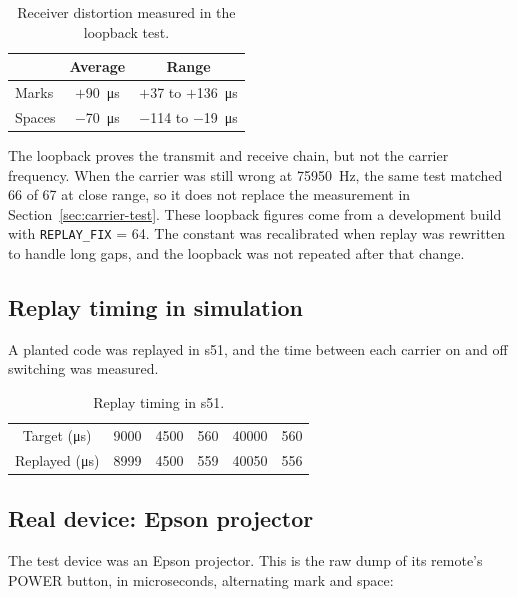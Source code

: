 \documentclass[11pt,a4paper]{article}
\newcommand{\code}[1]{\texttt{#1}}
\begin{document}
\begin{table}[H]
\centering
\caption{Receiver distortion measured in the loopback test.}
\label{tab:distortion}
\begin{tabular}{lcc}
\toprule
 & Average & Range\\
\midrule
Marks & $+$\qty{90}{\micro\second} & $+$37 to $+$\qty{136}{\micro\second}\\
Spaces & $-$\qty{70}{\micro\second} & $-$114 to $-$\qty{19}{\micro\second}\\
\bottomrule
\end{tabular}
\end{table}

The loopback proves the transmit and receive chain, but not the carrier frequency. When the carrier was still wrong at \qty{75950}{\hertz}, the same test matched 66 of 67 at close range, so it does not replace the measurement in Section~\ref{sec:carrier-test}. These loopback figures come from a development build with \code{REPLAY\_FIX} = 64. The constant was recalibrated when replay was rewritten to handle long gaps, and the loopback was not repeated after that change.

\subsection{Replay timing in simulation}

A planted code was replayed in s51, and the time between each carrier on and off switching was measured.

\begin{table}[H]
\centering
\caption{Replay timing in s51.}
\label{tab:replay}
\begin{tabular}{cccccc}
\toprule
Target (\unit{\micro\second}) & \num{9000} & \num{4500} & 560 & \num{40000} & 560\\
Replayed (\unit{\micro\second}) & \num{8999} & \num{4500} & 559 & \num{40050} & 556\\
\bottomrule
\end{tabular}
\end{table}

\subsection{Real device: Epson projector}
\label{sec:epson}

The test device was an Epson projector. This is the raw dump of its remote's POWER button, in microseconds, alternating mark and space:
\end{document}
